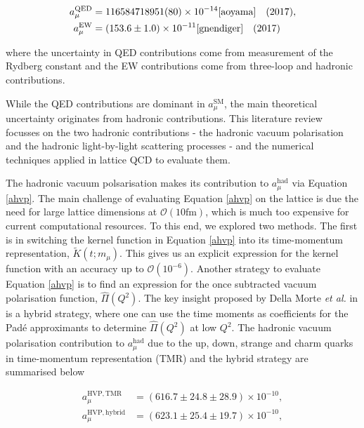 \documentclass{article}
\numberwithin{equation}{section} %
\begin{document}
\begin{equation}
\begin{split}
a^{\mathrm{QED}}_\mu&= 116 584 718 951 (80) \times 10^{-14}\text{\cite{aoyama}} \quad (2017),\\
a^{\mathrm{EW}}_\mu &= (153.6\pm 1.0) \times 10^{-11}\text{\cite{gnendiger}} \quad (2017)
\end{split}
\end{equation}

\noindent where the uncertainty in QED contributions come from measurement of the Rydberg constant\cite{aoyama} and the EW contributions come from three-loop and hadronic contributions\cite{gnendiger}.

While the QED contributions are dominant in $a_\mu^\mathrm{SM}$, the main theoretical uncertainty originates from hadronic contributions. This literature review focusses on the two hadronic contributions - the hadronic vacuum polarisation and the hadronic light-by-light scattering processes - and the numerical techniques applied in lattice QCD to evaluate them.

The hadronic vacuum polsarisation makes its contribution to $a_\mu^\mathrm{had}$ via Equation \ref{ahvp}. The main challenge of evaluating Equation \ref{ahvp} on the lattice is due the need for large lattice dimensions at $\mathcal{O}(10\mathrm{fm})$, which is much too expensive for current computational resources. To this end, we explored two methods. The first is in switching the kernel function in Equation \ref{ahvp} into its time-momentum representation, $\tilde{K}(t;m_\mu)$. This gives us an explicit expression for the kernel function with an accuracy up to $\mathcal{O}(10^{-6})$. Another strategy to evaluate Equation \ref{ahvp} is to find an expression for the once subtracted vacuum polarisation function, $\hat{\Pi}(Q^2)$. The key insight proposed by Della Morte \textit{et al.} in \cite{dellamorte} is a hybrid strategy, where one can use the time moments as coefficients for the Pad\'e approximants to determine $\hat{\Pi}(Q^2)$ at low $Q^2$. The hadronic vacuum polarisation contribution to $a_\mu^\mathrm{had}$ due to the up, down, strange and charm quarks in time-momentum representation (TMR) and the hybrid strategy are summarised below\cite{dellamorte}


\begin{equation}
\begin{split}
a_\mu^\mathrm{HVP,TMR} &= (616.7 \pm 24.8 \pm 28.9) \times 10^{-10} ,\\
a_\mu^\mathrm{HVP,hybrid} &= (623.1 \pm 25.4 \pm 19.7) \times 10^{-10}, 
\end{split}
\end{equation}
\end{document}
